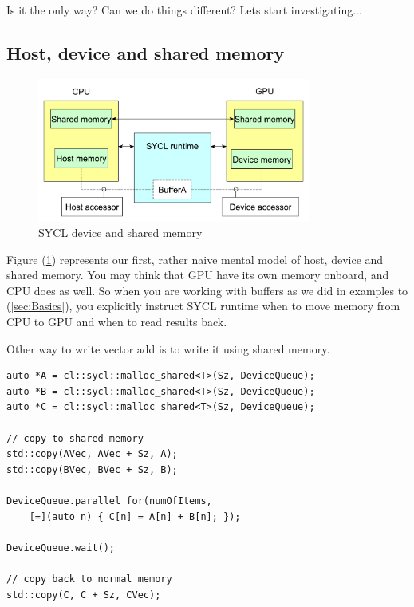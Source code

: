 \documentclass[a4paper,12pt,oneside]{article}
\begin{document}
Is it the only way? Can we do things different? Lets start investigating...

\subsection{Host, device and shared memory}\label{subsec:HostDevice}


\begin{figure}
\centering
\includegraphics[width=0.8\textwidth]{pictures/sycl-device-and-shared-mem.pdf}
\caption{SYCL device and shared memory}
\label{fig:sycl-device-and-shared-mem}
\end{figure}

Figure (\ref{fig:sycl-device-and-shared-mem}) represents our first, rather naive mental model of host, device and shared memory. You may think that GPU have its own memory onboard, and CPU does as well. So when you are working with buffers as we did in examples to (\ref{sec:Basics}), you explicitly instruct SYCL runtime when to move memory from CPU to GPU and when to read results back.

Other way to write vector add is to write it using shared memory.

\begin{lstlisting}
auto *A = cl::sycl::malloc_shared<T>(Sz, DeviceQueue);
auto *B = cl::sycl::malloc_shared<T>(Sz, DeviceQueue);
auto *C = cl::sycl::malloc_shared<T>(Sz, DeviceQueue);

// copy to shared memory
std::copy(AVec, AVec + Sz, A);
std::copy(BVec, BVec + Sz, B);

DeviceQueue.parallel_for(numOfItems,
    [=](auto n) { C[n] = A[n] + B[n]; });

DeviceQueue.wait();

// copy back to normal memory
std::copy(C, C + Sz, CVec);
\end{lstlisting}
\end{document}
